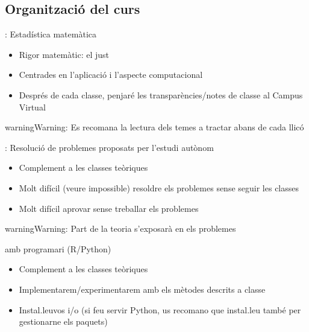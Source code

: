 \documentclass[letterpaper,10pt,english]{sphinxmanual}
\begin{document}
\subsection{Organització del curs}
\label{\detokenize{0_Intro/0_0_Intro_curs:organitzacio-del-curs}}
: Estadística matemàtica
\begin{itemize}
\item {} 
Rigor matemàtic: el just

\item {} 
Centrades en l’aplicació i l’aspecte computacional

\item {} 
Després de cada classe, penjaré les transparències/notes de classe al Campus Virtual

\end{itemize}

\begin{sphinxadmonition}{warning}{Warning:}
Es recomana la lectura  dels temes a tractar abans de cada llicó
\end{sphinxadmonition}

: Resolució de problemes proposats per l’estudi autònom
\begin{itemize}
\item {} 
Complement a les classes teòriques

\item {} 
Molt difícil (veure impossible) resoldre els problemes sense seguir les classes

\item {} 
Molt difícil aprovar sense treballar els problemes

\end{itemize}

\begin{sphinxadmonition}{warning}{Warning:}
Part de la teoria s’exposarà en els problemes
\end{sphinxadmonition}

 amb programari (R/Python)
\begin{itemize}
\item {} 
Complement a les classes teòriques

\item {} 
Implementarem/experimentarem amb els mètodes descrits a classe

\item {} 
Instal.leu\sphinxhyphen{}vos  i/o  (si feu servir Python, us recomano que instal.leu també  per gestionar\sphinxhyphen{}ne els paquets)

\end{itemize}
\end{document}
